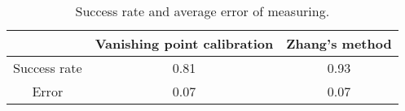 \begin{table}%
\centering
\begin{tabular}{@{} *3c @{}}
\toprule
&{Vanishing point calibration} & {Zhang's method}\\ 
\midrule
Success rate & 0.81 & 0.93 \\ 
Error & 0.07 & 0.07 \\
\bottomrule 
 \end{tabular}
 \caption{Success rate and average error of measuring.}
\label{table:measuring_overall}
\end{table}